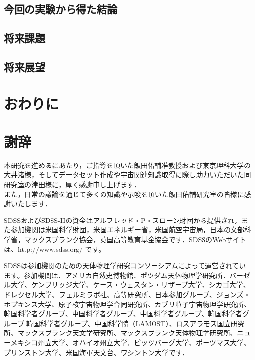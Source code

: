 \documentclass[a4j, 11pt]{jreport}
\begin{document}
\section{今回の実験から得た結論}
\section{将来課題}
\section{将来展望}

\newpage
\chapter{おわりに}





\newpage
\nocite{*}                 %


\newpage
\chapter*{謝辞}
本研究を進めるにあたり，ご指導を頂いた飯田佑輔准教授および東京理科大学の大井渚様，そしてデータセット作成や宇宙関連知識取得に際し助力いただいた同研究室の津田様に，厚く感謝申し上げます．\\
また，日常の議論を通じて多くの知識や示唆を頂いた飯田佑輔研究室の皆様に感謝いたします．

SDSSおよびSDSS-IIの資金はアルフレッド・P・スローン財団から提供され，また参加機関は米国科学財団，米国エネルギー省，米国航空宇宙局，日本の文部科学省，マックスプランク協会，英国高等教育基金協会です．SDSSのWebサイトは、http://www.sdss.org/ です。 

SDSSは参加機関のための天体物理学研究コンソーシアムによって運営されています。参加機関は、アメリカ自然史博物館、ポツダム天体物理学研究所、バーゼル大学、ケンブリッジ大学、ケース・ウェスタン・リザーブ大学、シカゴ大学、ドレクセル大学、フェルミラボ社、高等研究所、日本参加グループ、ジョンズ・ホプキンス大学、原子核宇宙物理学合同研究所、カブリ粒子宇宙物理学研究所、韓国科学者グループ、中国科学者グループ、中国科学者グループ、韓国科学者グループ 韓国科学者グループ、中国科学院（LAMOST）、ロスアラモス国立研究所、マックスプランク天文学研究所、マックスプランク天体物理学研究所、ニューメキシコ州立大学、オハイオ州立大学、ピッツバーグ大学、ポーツマス大学、プリンストン大学、米国海軍天文台、ワシントン大学です．
\end{document}
